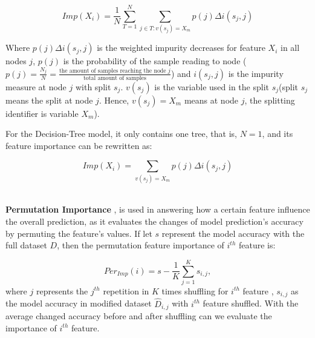 \documentclass{article}
\begin{document}
$$Imp(X_i) = \frac{1}{N} \sum_{T=1}^{N} \sum_{j\in T: v(s_j)=X_m} p(j) \Delta i(s_j, j)$$

Where $p(j) \Delta i(s_j, j)$ is the weighted impurity decreases for feature $X_i$ in all nodes $j$, $p(j)$ is the probability of the sample reading to node ($p(j) = \frac{N_j}{N} = \frac{\text{the amount of samples reaching the node $j$}}{\text{total amount of samples}}$) and $i(s_j, j)$ is the impurity measure at node $j$ with split $s_j$. $v(s_j)$ is the variable used in the split $s_j$(split $s_j$ means the split at node $j$. Hence, $v(s_j) = X_m$ means at node $j$, the splitting identifier is variable $X_m$).

For the Decision-Tree model, it only contains one tree, that is, $N = 1$, and its feature importance can be rewritten as:

$$Imp(X_i) = \sum_{v(s_j)=X_m} p(j) \Delta i(s_j, j)$$
\\
\par\noindent\textbf{Permutation Importance} \cite{breiman2001random,altmann2010permutation, fisher2019all,scikit-learn}, is used in answering how a certain feature influence the overall prediction, as it evaluates the changes of model prediction's accuracy by permuting the feature's values. If let $s$ represent the model accuracy with the full dataset $D$, then the permutation feature importance of $i^{th}$ feature  is:

$$Per_{Imp}(i) = s - \frac{1}{K} \sum_{j=1}^K s_{i, j}, $$
where $j$ represents the $j^{th}$ repetition in $K$ times shuffling for $i^{th}$ feature  , $s_{i, j}$ as the model accuracy in modified dataset $\hat{D}_{i, j}$ with $i^{th}$ feature  shuffled. With the average changed accuracy before and after shuffling can we evaluate the importance of $i^{th}$ feature.

\end{document}
